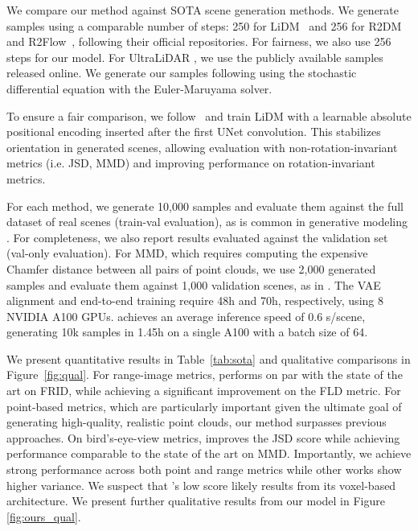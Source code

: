 We compare our method against SOTA scene generation methods. We generate samples using a comparable number of steps: 250 for LiDM~\cite{ran_towards_2024} and 256 for R2DM~\cite{nakashima_lidar_2024} and R2Flow~\cite{nakashima_fast_2025}, following their official repositories. For fairness, we also use 256 steps for our model. For UltraLiDAR \cite{xiong_ultralidar_2023}, we use the publicly available samples released online. We generate our samples following \cite{ma_sit_2024} using the stochastic differential equation with the Euler-Maruyama solver.

To ensure a fair comparison, we follow~\cite{nakashima_fast_2025} and train LiDM \cite{ran_towards_2024} with a learnable absolute positional encoding inserted after the first UNet convolution.
This stabilizes orientation in generated scenes, allowing evaluation with non-rotation-invariant metrics (i.e. JSD, MMD) and improving performance on rotation-invariant metrics.

For each method, we generate 10,000 samples and evaluate them against the full dataset of real scenes (train-val evaluation), as is common in generative modeling \cite{nakashima_fast_2025}. 
For completeness, we also report results evaluated against the validation set (val-only evaluation).
For MMD, which requires computing the expensive Chamfer distance between all pairs of point clouds, we use 2,000 generated samples and evaluate them against 1,000 validation scenes, as in \cite{ran_towards_2024}.
The VAE alignment and end-to-end training require 48h and 70h, respectively, using 8 NVIDIA A100 GPUs.  \ours achieves an average inference speed of 0.6 s/scene, generating 10k samples in 1.45h on a single A100 with a batch size of 64.

We present quantitative results in Table~\ref{tab:sota} and qualitative comparisons in Figure~\ref{fig:qual}. For range-image metrics, \ours performs on par with the state of the art on FRID, while achieving a significant improvement on the FLD metric. For point-based metrics, which are particularly important given the ultimate goal of generating high-quality, realistic point clouds, our method surpasses previous approaches.
On bird’s-eye-view metrics, \ours improves the JSD score while achieving performance comparable to the state of the art on MMD.
Importantly, we achieve strong performance across both point and range metrics while other works show higher variance. We suspect that \cite{xiong_ultralidar_2023}'s low score likely results from its voxel-based architecture.
We present further qualitative results from our model in Figure \ref{fig:ours_qual}.


